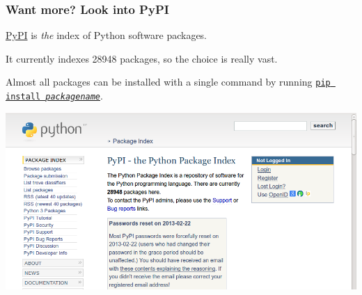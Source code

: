 \documentclass[english,serif,mathserif,xcolor=pdftex,dvipsnames,table]{beamer}
\begin{document}
\begin{frame}
  \frametitle{Want more? Look into PyPI}

  \href{http://pypi.python.org}{PyPI} is \emph{the} index of Python software packages.

  \+ It currently indexes 28948 packages, so the choice is really vast.

  \+ Almost all packages can be installed with a single command by
  running \href{https://pypi.python.org/pypi/pip}{\texttt{pip install
    \emph{packagename}}}.

\includegraphics[width=1\textwidth]{fig/pypi_screenshot.png}
\end{frame}
\end{document}

